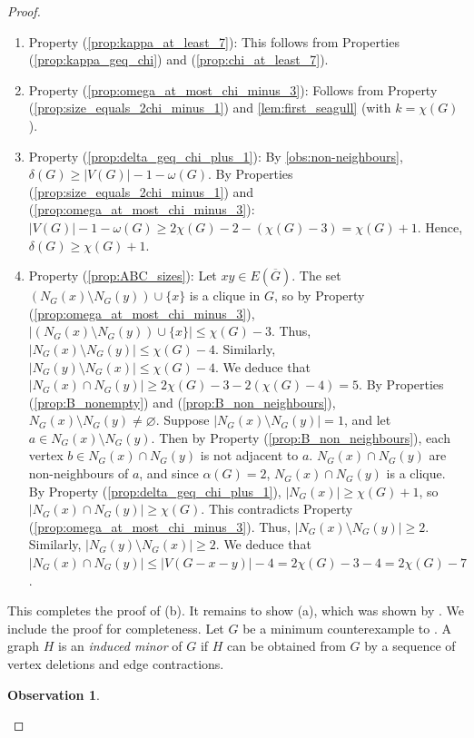\documentclass[11pt]{article}
\numberwithin{equation}{section}
\theoremstyle{plain}
\newtheorem{obs}[equation]{Observation}
\theoremstyle{definition}
\renewcommand{\geq}{\geqslant}
\renewcommand{\leq}{\leqslant}
\newcommand{\defn}[1]{\textcolor{green!50!black}{\textit{#1}}}
\newcommand{\propref}[1]{\textup{(\ref{#1})}}
\begin{document}
\begin{proof}
\begin{enumerate}[label={}, leftmargin=0em, itemsep=1.5pt]
        \item Property \propref{prop:kappa_at_least_7}: This follows from Properties \propref{prop:kappa_geq_chi} and \propref{prop:chi_at_least_7}.
        \item Property \propref{prop:omega_at_most_chi_minus_3}: Follows from Property \propref{prop:size_equals_2chi_minus_1} and \cref{lem:first_seagull} (with $k = \chi(G)$).
        \item Property \propref{prop:delta_geq_chi_plus_1}: By \cref{obs:non-neighbours},
              $\delta(G) \geq |V(G)| - 1 - \omega(G)$.
              By Properties \propref{prop:size_equals_2chi_minus_1} and \propref{prop:omega_at_most_chi_minus_3}:
              $|V(G)| - 1 - \omega(G) \geq 2 \chi(G) - 2 - (\chi(G) - 3) = \chi(G) + 1$.
              Hence, $\delta(G) \geq \chi(G) + 1$.
        \item Property \propref{prop:ABC_sizes}: Let $xy \in E(\overline{G})$. The set $(N_G(x) \setminus N_G(y)) \cup \{x\}$ is a clique in $G$, so by Property \propref{prop:omega_at_most_chi_minus_3}, $|(N_G(x) \setminus N_G(y)) \cup \{x\}| \leq \chi(G) - 3$. Thus, $|N_G(x) \setminus N_G(y)| \leq \chi(G) -4$. Similarly, $|N_G(y) \setminus N_G(x)| \leq \chi(G) -4$.
              We deduce that $|N_G(x) \cap N_G(y)| \geq 2\chi(G) - 3 - 2(\chi(G) - 4) = 5$. By Properties \propref{prop:B_nonempty} and \propref{prop:B_non_neighbours}, $N_G(x) \setminus N_G(y) \neq \varnothing$. Suppose $|N_G(x) \setminus N_G(y)| = 1$, and let $a \in N_G(x) \setminus N_G(y)$. Then by Property \propref{prop:B_non_neighbours}, each vertex $b \in N_G(x) \cap N_G(y)$ is not adjacent to $a$. $N_G(x) \cap N_G(y)$ are non-neighbours of $a$, and since $\alpha(G) = 2$, $N_G(x) \cap N_G(y)$ is a clique. By Property \propref{prop:delta_geq_chi_plus_1}, $|N_G(x)| \geq \chi(G) + 1$, so $|N_G(x) \cap N_G(y)| \geq \chi(G)$. This contradicts Property \propref{prop:omega_at_most_chi_minus_3}. Thus, $|N_G(x) \setminus N_G(y)| \geq 2$. Similarly, $|N_G(y) \setminus N_G(x)| \geq 2$. We deduce that $|N_G(x) \cap N_G(y)| \leq |V(G-x-y)| - 4 = 2\chi(G) - 3 - 4 = 2\chi(G) - 7$.
    \end{enumerate}
    This completes the proof of (b). It remains to show (a), which was shown by \citet{PST03}. We include the proof for completeness. Let $G$ be a minimum counterexample to . A graph $H$ is an \defn{induced minor} of $G$ if $H$ can be obtained from $G$ by a sequence of vertex deletions and edge contractions.
    \begin{obs}
        \label{obs:induced_minors}

\end{obs}
\end{proof}
\end{document}
